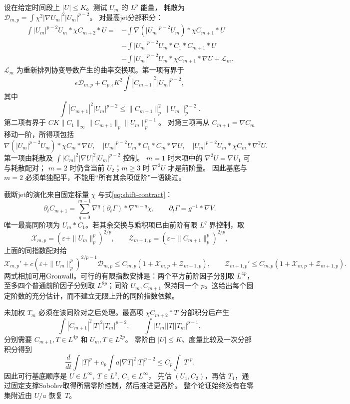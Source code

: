 \documentclass[UTF8,a4paper,11pt,fontset=fandol]{ctexart}
\numberwithin{equation}{section}
\theoremstyle{definition}
\begin{document}
设在给定时间段上 $|U|\le K$。测试 $U_m$ 的 $L^p$ 能量，
耗散为 $\mathcal D_{m,p}=\int\chi^2|\nabla U_m|^2|U_m|^{p-2}$。
对最高jet分部积分：
\begin{align*}
\int |U_m|^{p-2}U_m*\chi C_{m+2}*U
={}&-\int\nabla(|U_m|^{p-2}U_m)*\chi C_{m+1}*U\\
&-\int|U_m|^{p-2}U_m*C_1*C_{m+1}*U\\
&-\int|U_m|^{p-2}U_m*\chi C_{m+1}*\nabla U
+\mathcal L_m .
\end{align*}
$\mathcal L_m$ 为重新排列协变导数产生的曲率交换项。第一项有界于
\[
\epsilon\mathcal D_{m,p}
+C_{p,\epsilon}K^2\int|C_{m+1}|^2|U_m|^{p-2},
\]
其中
\[
\int|C_{m+1}|^2|U_m|^{p-2}
\le\|C_{m+1}\|_p^2\|U_m\|_p^{p-2}.
\]
第二项有界于 $CK\|C_1\|_\infty\|C_{m+1}\|_p\|U_m\|_p^{p-1}$。
对第三项再从 $C_{m+1}=\nabla C_m$ 移动一阶，所得项包括
\[
\nabla(|U_m|^{p-2}U_m)*\chi C_m*\nabla U,\quad
|U_m|^{p-2}U_m*C_1*C_m*\nabla U,\quad
|U_m|^{p-2}U_m*\chi C_m*\nabla^2U.
\]
第一项由耗散及 $\int|C_m|^2|\nabla U|^2|U_m|^{p-2}$ 控制。
$m=1$ 时末项中的 $\nabla^2U=\nabla U_1$ 可与耗散配对；
$m=2$ 时仍含当前 $U_2$；$m\ge3$ 时 $\nabla^2U$ 才是前阶量。
因此基底与 $m=2$ 必须单独配平，不能用“所有其余项低阶”一语跳过。

截断jet的演化来自固定标量 $\chi$ 与式\eqref{eq:shift-contract}：
\[
\partial_tC_{m+1}
=\sum_{q=0}^{m-1}\nabla^q(\partial_t\Gamma)*\nabla^{m-q}\chi,
\qquad \partial_t\Gamma=g^{-1}*\nabla V.
\]
唯一最高同阶项为 $U_m*C_1$。若其余交换与乘积项已由前阶有限 $L^q$ 界控制，取
\[
\mathcal X_{m,p}=(\varepsilon+\|U_m\|_p^p)^{2/p},\qquad
\mathcal Z_{m+1,p}=(\varepsilon+\|C_{m+1}\|_p^p)^{2/p},
\]
上面的同指数配对给
\[
\mathcal X_{m,p}'+c(\varepsilon+\|U_m\|_p^p)^{2/p-1}\mathcal D_{m,p}
\le C_{m,p}(1+\mathcal X_{m,p}+\mathcal Z_{m+1,p}),\qquad
\mathcal Z_{m+1,p}'\le C_{m,p}(1+\mathcal X_{m,p}+\mathcal Z_{m+1,p}).
\]
两式相加可用Gronwall。可行的有限指数安排是：两个平方前阶因子分别取 $L^{4p}$，至多四个普通前阶因子分别取 $L^{8p}$；同阶 $U_m,C_{m+1}$ 保持同一个 $p$。这给出每个固定阶数的充分估计，而不建立无限上升的同阶指数依赖。

未加权 $T_m$ 必须在该同阶对之后处理。最高项
$\chi C_{m+2}*T$ 分部积分后产生
\[
\int|C_{m+1}|^2|T|^2|T_m|^{p-2},\qquad
\int|U_m||T||T_m|^{p-1},
\]
分别需要 $C_{m+1},T\in L^{4p}$ 和 $U_m,T\in L^{2p}$。
零阶由 $|U|\le K$、度量比较及一次分部积分得到
\[
\frac d{dt}\int|T|^p+c_p\int a|\nabla T|^2|T|^{p-2}
\le C_p\int|T|^p.
\]
因此可行基底顺序是
$U\in L^\infty,\ T\in L^q,\ C_1\in L^\infty$，
先估 $(U_1,C_2)$，再估 $T_1$，通过固定支撑Sobolev取得所需零阶控制，然后推进更高阶。
整个论证始终没有在零集附近由 $U/a$ 恢复 $T$。
\end{document}
